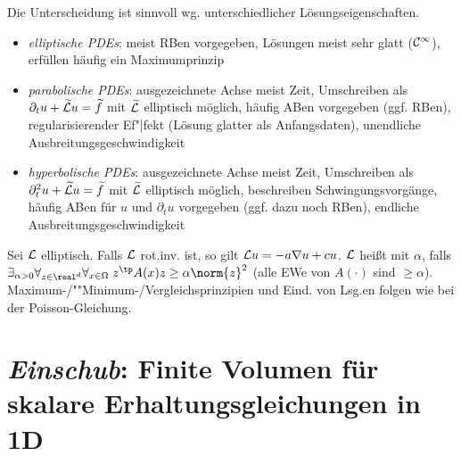 \begin{Bem}
    Die Unterscheidung ist sinnvoll wg. unterschiedlicher Lösungseigenschaften.
    \begin{itemize}
        \item
        \emph{elliptische PDEs}:
        meist RBen vorgegeben,
        Lösungen meist sehr glatt ($\mathcal{C}^\infty$),
        erfüllen häufig ein Maximumprinzip

        \item
        \emph{parabolische PDEs}:
        ausgezeichnete Achse meist Zeit,
        Umschreiben als $\partial_t u + \widetilde{\mathcal{L}} u = \widetilde{f}$ mit
        $\widetilde{\mathcal{L}}$ elliptisch möglich,
        häufig ABen vorgegeben (ggf. RBen),
        regularisierender Ef"|fekt (Lösung glatter als Anfangsdaten),
        unendliche Ausbreitungsgeschwindigkeit

        \item
        \emph{hyperbolische PDEs}:
        ausgezeichnete Achse meist Zeit,
        Umschreiben als $\partial_t^2 u + \widetilde{\mathcal{L}} u = \widetilde{f}$ mit
        $\widetilde{\mathcal{L}}$ elliptisch möglich,
        beschreiben Schwingungsvorgänge,
        häufig ABen für $u$ und $\partial_t u$ vorgegeben (ggf. dazu noch RBen),
        endliche Ausbreitungsgeschwindigkeit
    \end{itemize}
\end{Bem}

\begin{Bem}
    Sei $\mathcal{L}$ elliptisch.
    Falls $\mathcal{L}$ rot.inv. ist, so gilt $\mathcal{L} u = -a \nabla u + cu$.
    $\mathcal{L}$ heißt  mit  $\alpha$, falls
    $\exists_{\alpha > 0} \forall_{z \in \real^d} \forall_{x \in \Omega}\;
    z^\tp A(x) z \ge \alpha \norm{z}^2$
    (alle EWe von $A(\cdot)$ sind $\ge \alpha$).
    Maximum-/""Minimum-/Vergleichsprinzipien und Eind. von Lsg.en folgen wie bei
    der Poisson-Gleichung.
\end{Bem}

\pagebreak

\section{%
    \emph{Einschub}:
    Finite Volumen für skalare Erhaltungsgleichungen in 1D%
}

